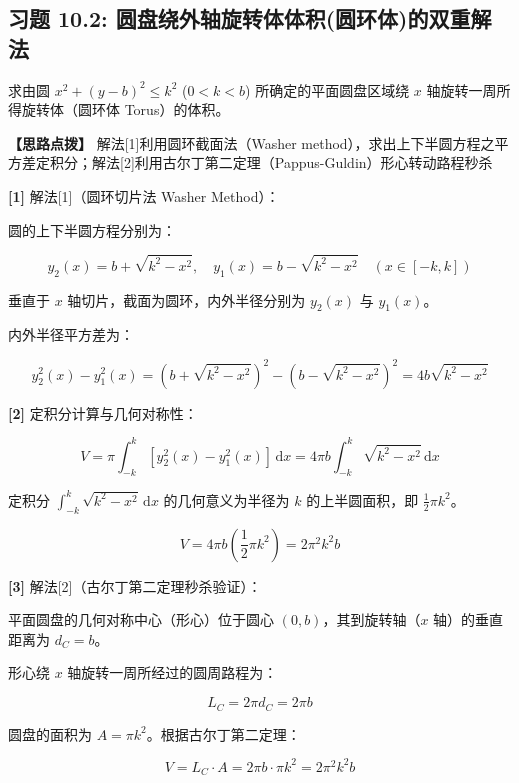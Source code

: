 \documentclass[11pt,a4paper,UTF8]{ctexart}
\begin{document}
\subsection{习题 10.2: 圆盘绕外轴旋转体体积(圆环体)的双重解法}

求由圆 $x^2 + (y-b)^2 \leqslant k^2$ ($0 < k < b$) 所确定的平面圆盘区域绕 $x$ 轴旋转一周所得旋转体（圆环体 Torus）的体积。

\textbf{\color{DeepPurple}【思路点拨】} 解法[1]利用圆环截面法（Washer method），求出上下半圆方程之平方差定积分；解法[2]利用古尔丁第二定理（Pappus-Guldin）形心转动路程秒杀


\begin{solbox}[分步推导与答题规范]
\textbf{[1]} 解法[1]（圆环切片法 Washer Method）：

圆的上下半圆方程分别为：


\begin{equation*}
y_2(x) = b + \sqrt{k^2-x^2}, \quad y_1(x) = b - \sqrt{k^2-x^2} \quad (x \in [-k, k])
\end{equation*}


垂直于 $x$ 轴切片，截面为圆环，内外半径分别为 $y_2(x)$ 与 $y_1(x)$。

内外半径平方差为：


\begin{equation*}
y_2^2(x) - y_1^2(x) = \left(b + \sqrt{k^2-x^2}\right)^2 - \left(b - \sqrt{k^2-x^2}\right)^2 = 4b\sqrt{k^2-x^2}
\end{equation*}


\textbf{[2]} 定积分计算与几何对称性：


\begin{equation*}
V = \pi \int_{-k}^k [y_2^2(x) - y_1^2(x)]\,\mathrm{d}x = 4\pi b \int_{-k}^k \sqrt{k^2-x^2}\,\mathrm{d}x
\end{equation*}


定积分 $\int_{-k}^k \sqrt{k^2-x^2}\,\mathrm{d}x$ 的几何意义为半径为 $k$ 的上半圆面积，即 $\frac{1}{2}\pi k^2$。


\begin{equation*}
V = 4\pi b \left(\frac{1}{2}\pi k^2\right) = 2\pi^2 k^2 b
\end{equation*}


\textbf{[3]} 解法[2]（古尔丁第二定理秒杀验证）：

平面圆盘的几何对称中心（形心）位于圆心 $(0, b)$，其到旋转轴（$x$ 轴）的垂直距离为 $d_C = b$。

形心绕 $x$ 轴旋转一周所经过的圆周路程为：


\begin{equation*}
L_C = 2\pi d_C = 2\pi b
\end{equation*}


圆盘的面积为 $A = \pi k^2$。根据古尔丁第二定理：


\begin{equation*}
V = L_C \cdot A = 2\pi b \cdot \pi k^2 = 2\pi^2 k^2 b
\end{equation*}

\end{solbox}
\end{document}
